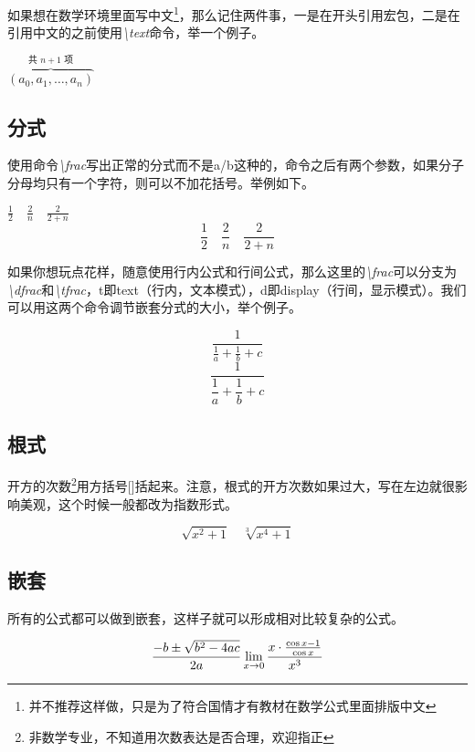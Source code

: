 如果想在数学环境里面写中文\footnote{并不推荐这样做，只是为了符合国情才有教材在数学公式里面排版中文}，那么记住两件事，一是在开头引用\CTeX 宏包，二是在引用中文的之前使用\emph{\textbackslash text}命令，举一个例子。
\begin{codeshow}
$\overbrace{(a_0,a_1,\dots,a_n)}
^{\text{共 $n+1$ 项}}$
\end{codeshow}

\subsection{分式}
使用命令\emph{\textbackslash frac}写出正常的分式而不是a/b这种的，命令之后有两个参数，如果分子分母均只有一个字符，则可以不加花括号。举例如下。
\begin{codeshow}
$\frac12 \quad \frac2n
\quad \frac{2}{2+n}$
\[ \frac12 \quad \frac2n
\quad \frac{2}{2+n} \]
\end{codeshow}

如果你想玩点花样，随意使用行内公式和行间公式，那么这里的\emph{\textbackslash frac}可以分支为\emph{\textbackslash dfrac}和\emph{\textbackslash tfrac}，t即text（行内，文本模式），d即display（行间，显示模式）。我们可以用这两个命令调节嵌套分式的大小，举个例子。
\begin{codeshow}
\[ \frac{1}{\tfrac1a+\tfrac1b+c} \]
\[ \frac{1}{\dfrac1a+\dfrac1b+c} \]
\end{codeshow}

\subsection{根式}
开方的次数\footnote{非数学专业，不知道用次数表达是否合理，欢迎指正}用方括号[]括起来。注意，根式的开方次数如果过大，写在左边就很影响美观，这个时候一般都改为指数形式。
\begin{codeshow}
\[
\sqrt{x^2+1}\quad \sqrt[3]{x^4+1}
\]
\end{codeshow}

\subsection{嵌套}
所有的公式都可以做到嵌套，这样子就可以形成相对比较复杂的公式。
\begin{codeshow}
\[
\frac{-b\pm \sqrt{b^{2}-4ac}}{2a}\\
\lim\limits_{x\to 0}\frac
{x\cdot \frac{\cos x -1}{\cos x}}{x^{3}}
\]
\end{codeshow}


